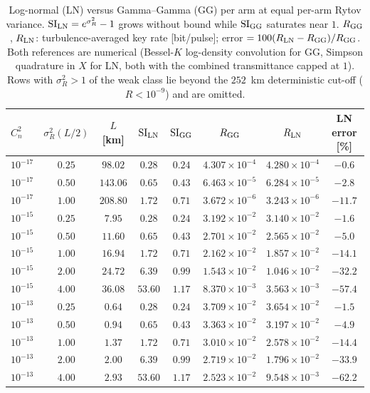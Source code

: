 \begin{table}[htbp]
\centering\small
\caption{Log-normal (LN) versus Gamma--Gamma (GG) per arm at equal per-arm Rytov variance. $\mathrm{SI}_{\rm LN}=e^{\sigma_R^2}-1$ grows without bound while $\mathrm{SI}_{\rm GG}$ saturates near $1$. $R_{\rm GG}$, $R_{\rm LN}$: turbulence-averaged key rate [bit/pulse]; error $=100(R_{\rm LN}-R_{\rm GG})/R_{\rm GG}$. Both references are numerical (Bessel-$K$ log-density convolution for GG, Simpson quadrature in $X$ for LN, both with the combined transmittance capped at $1$). Rows with $\sigma_R^2>1$ of the weak class lie beyond the $252$~km deterministic cut-off ($R<10^{-9}$) and are omitted.}
\label{tab:lnvsgg}
\begin{tabular}{lccccccc}
\toprule
$C_n^2$ & $\sigma_R^2(L/2)$ & $L$ [km] & $\mathrm{SI}_{\rm LN}$ & $\mathrm{SI}_{\rm GG}$ & $R_{\rm GG}$ & $R_{\rm LN}$ & LN error [\%]\\
\midrule
$10^{-17}$ & $0.25$ & $98.02$ & $0.28$ & $0.24$ & $4.307\times10^{-4}$ & $4.280\times10^{-4}$ & $-0.6$ \\
$10^{-17}$ & $0.50$ & $143.06$ & $0.65$ & $0.43$ & $6.463\times10^{-5}$ & $6.284\times10^{-5}$ & $-2.8$ \\
$10^{-17}$ & $1.00$ & $208.80$ & $1.72$ & $0.71$ & $3.672\times10^{-6}$ & $3.243\times10^{-6}$ & $-11.7$ \\
\midrule
$10^{-15}$ & $0.25$ & $7.95$ & $0.28$ & $0.24$ & $3.192\times10^{-2}$ & $3.140\times10^{-2}$ & $-1.6$ \\
$10^{-15}$ & $0.50$ & $11.60$ & $0.65$ & $0.43$ & $2.701\times10^{-2}$ & $2.565\times10^{-2}$ & $-5.0$ \\
$10^{-15}$ & $1.00$ & $16.94$ & $1.72$ & $0.71$ & $2.162\times10^{-2}$ & $1.857\times10^{-2}$ & $-14.1$ \\
$10^{-15}$ & $2.00$ & $24.72$ & $6.39$ & $0.99$ & $1.543\times10^{-2}$ & $1.046\times10^{-2}$ & $-32.2$ \\
$10^{-15}$ & $4.00$ & $36.08$ & $53.60$ & $1.17$ & $8.370\times10^{-3}$ & $3.563\times10^{-3}$ & $-57.4$ \\
\midrule
$10^{-13}$ & $0.25$ & $0.64$ & $0.28$ & $0.24$ & $3.709\times10^{-2}$ & $3.654\times10^{-2}$ & $-1.5$ \\
$10^{-13}$ & $0.50$ & $0.94$ & $0.65$ & $0.43$ & $3.363\times10^{-2}$ & $3.197\times10^{-2}$ & $-4.9$ \\
$10^{-13}$ & $1.00$ & $1.37$ & $1.72$ & $0.71$ & $3.010\times10^{-2}$ & $2.578\times10^{-2}$ & $-14.4$ \\
$10^{-13}$ & $2.00$ & $2.00$ & $6.39$ & $0.99$ & $2.719\times10^{-2}$ & $1.796\times10^{-2}$ & $-33.9$ \\
$10^{-13}$ & $4.00$ & $2.93$ & $53.60$ & $1.17$ & $2.523\times10^{-2}$ & $9.548\times10^{-3}$ & $-62.2$ \\

\bottomrule
\end{tabular}
\end{table}

